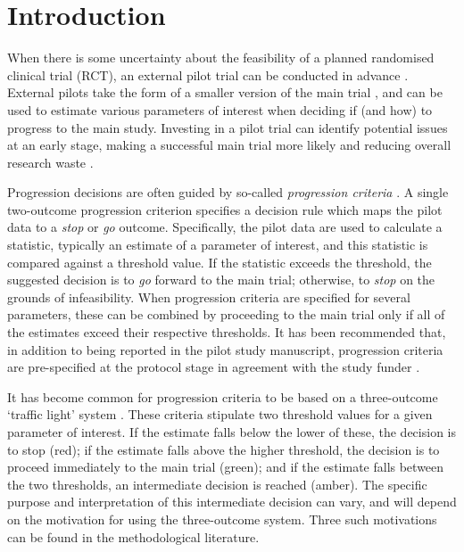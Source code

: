 \documentclass[referee, lineno, pdflatex,sn-vancouver,Numbered]{sn-jnl}%
\theoremstyle{thmstyleone}%
\theoremstyle{thmstyletwo}%
\theoremstyle{thmstylethree}%
\begin{document}
\section{Introduction}\label{sec:introduction}

When there is some uncertainty about the feasibility of a planned randomised clinical trial (RCT), an external pilot trial can be conducted in advance \cite{Thabane2010, Arain2010}. External pilots take the form of a smaller version of the main trial \cite{Eldridge2016}, and can be used to estimate various parameters of interest when deciding if (and how) to progress to the main study. Investing in a pilot trial can identify potential issues at an early stage, making a successful main trial more likely and reducing overall research waste \cite{Morgan2018}.

Progression decisions are often guided by so-called \emph{progression criteria} \cite{Eldridge2016a}. A single two-outcome progression criterion specifies a decision rule which maps the pilot data to a \emph{stop} or \emph{go} outcome. Specifically, the pilot data are used to calculate a statistic, typically an estimate of a parameter of interest, and this statistic is compared against a threshold value. If the statistic exceeds the threshold, the suggested decision is to \emph{go} forward to the main trial; otherwise, to \emph{stop} on the grounds of infeasibility. When progression criteria are specified for several parameters, these can be combined by proceeding to the main trial only if all of the estimates exceed their respective thresholds. It has been recommended that, in addition to being reported in the pilot study manuscript, progression criteria are pre-specified at the protocol stage in agreement with the study funder \cite{NIHR2017, Mbuagbaw2019}.

It has become common for progression criteria to be based on a three-outcome `traffic light' system \cite{Avery2017}. These criteria stipulate two threshold values for a given parameter of interest. If the estimate falls below the lower of these, the decision is to stop (red); if the estimate falls above the higher threshold, the decision is to proceed immediately to the main trial (green); and if the estimate falls between the two thresholds, an intermediate decision is reached (amber). The specific purpose and interpretation of this intermediate decision can vary, and will depend on the motivation for using the three-outcome system. Three such motivations can be found in the methodological literature. 
\end{document}
